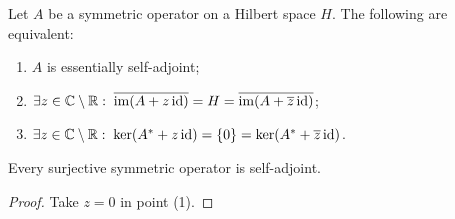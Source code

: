 \begin{corollary}
Let $A$ be a symmetric operator on a Hilbert space $H$. The following are equivalent:
\begin{enumerate}
\item $A$ is essentially self-adjoint;
\item $\exists z \in \mathbb{C}\setminus\mathbb{R}: \; \overline{\operatorname{im}(A+z\operatorname{id})} = H = \overline{\operatorname{im}(A+\overline{z}\operatorname{id})}$;
\item $\exists z \in \mathbb{C}\setminus\mathbb{R}: \; \ker(A^*+z\operatorname{id}) = \{0\} = \ker(A^*+\overline{z}\operatorname{id})$.
\end{enumerate}
\end{corollary}
\begin{corollary}
Every surjective symmetric operator is self-adjoint.
\end{corollary}
\begin{proof}
Take $z=0$ in point (1).
\end{proof}

